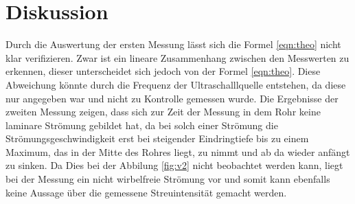 \section{Diskussion}
\label{sec:Diskussion}
Durch die Auswertung der ersten Messung lässt sich die
Formel \eqref{eqn:theo} nicht klar verifizieren. Zwar ist ein lineare
Zusammenhang zwischen den Messwerten zu erkennen,
dieser unterscheidet sich
jedoch von der Formel \eqref{eqn:theo}. Diese Abweichung
könnte durch die Frequenz der Ultraschalllquelle entstehen, da diese
nur angegeben war und
nicht zu Kontrolle gemessen wurde.
Die Ergebnisse der zweiten Messung zeigen, dass sich zur Zeit der
Messung in dem Rohr keine laminare Strömung gebildet hat, da
bei solch einer Strömung die Strömungsgeschwindigkeit erst bei
steigender Eindringtiefe bis zu einem Maximum, das in der Mitte des Rohres liegt,
zu nimmt und ab da wieder anfängt zu sinken.
Da Dies bei der Abbilung \ref{fig:v2} nicht beobachtet werden kann, liegt bei
der Messung ein nicht wirbelfreie Strömung vor und somit kann ebenfalls
keine Aussage über die gemessene Streuintensität gemacht werden.
